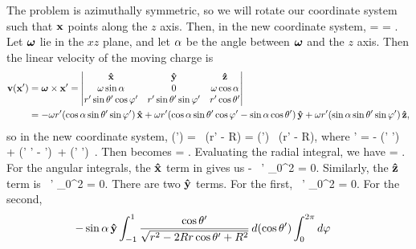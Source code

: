 \begin{solution}
	The problem is azimuthally symmetric, so we will rotate our coordinate system such that $\vb{x}$ points along the $z$ axis.  Then, in the new coordinate system,
	\beq
		 = 
		= .
	\eeq
	Let $\boldsymbol{\omega}$ lie in the $xz$ plane, and let $\alpha$ be the angle between $\boldsymbol{\omega}$ and the $z$ axis.  Then the linear velocity of the moving charge is
	\begin{align*}
		\vv(\vx') &= \vomg \times \vx'
		= \mqty| \xh & \yh & \zh \\
			\omg \sin\alp & 0 & \omg \cos\alp \\
			r' \sin\tht' \cos\vph' & r' \sin\tht' \sin\vph' & r' \cos\tht' | \\
		&= - \omg r' (\cos\alp \sin\tht' \sin\vph') \,\xh + \omg r' (\cos\alp \sin\tht' \cos\vph' - \sin\alp \cos\tht') \,\yh + \omg r' (\sin\alp \sin\tht' \sin\vph') \,\zh,
	\end{align*}
	so in the new coordinate system,
	\beq
		\vJ(\vx') =   \, \delta(r' - R)
		=   (\omgh \times \xh') \, \delta(r' - R),
	\eeq
	where
	\beqn \label{ucross}
		\omgh \times \xh' = - (\cos\alp \sin\tht' \sin\vph') \,\xh + (\cos\alp \sin\tht' \cos\vph' - \sin\alp \cos\tht') \,\yh + (\sin\alp \sin\tht' \sin\vph') \,\zh.
	\eeqn
	Then  becomes
	\beq
		\vAx =   \intotp \intono \intoi {} \drp \dctp \dvp.
	\eeq
	Evaluating the radial integral, we have
	\beqn \label{int2}
		\vAx =  \intotp \intono {} \dctp \dvp.
	\eeqn
	For the angular integrals, the $\vb{\hat{x}}$ term in  gives us
	\beq
		- \cos\alp \,\xh \intono {} \dctp \intotp \sin\vph' \dvp
		\propto {}_0^{2\pi}
		= 0.
	\eeq
	Similarly, the $\vb{\hat{z}}$ term is
	\beq
		\sin\alp \,\zh \intono {} \dctp \intotp \sin\vph' \dvp
		\propto {}_0^{2\pi}
		= 0.
	\eeq
	There are two $\vb{\hat{y}}$ terms.  For the first,
	\beq
		\cos\alp \,\yh \intono {} \dctp \intotp \cos\vph' \dvp
		\propto {}_0^{2\pi}
		= 0.
	\eeq
	For the second,
	\begin{align*}
		-\sin\alp \,\yh &\intono \frac{\cos\tht'}{\sqrt{r^2 - 2 R r  \cos\tht' + R^2}} \dctp \intotp \dvp

\end{align*}
\end{solution}
